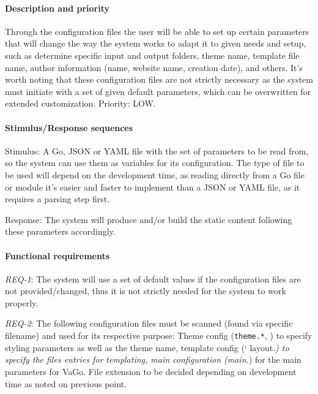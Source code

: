 \paragraph{Description and
priority}\label{par:description-and-priority-3}

Through the configuration files the user will be able to set up certain
parameters that will change the way the system works to adapt it to
given needs and setup, such as determine specific input and output
folders, theme name, template file name, author information (name,
website name, creation date), and others. It's worth noting that these
configuration files are not strictly necessary as the system must
initiate with a set of given default parameters, which can be
overwritten for extended customization. Priority: LOW.

\paragraph{Stimulus/Response
sequences}\label{par:stimulusresponse-sequences-3}

Stimulus: A Go\cite{donovan2015go}, JSON\cite{wikijson} or YAML\cite{wikiyaml} file with the set of parameters to be read
from, so the system can use them as variables for its configuration. The
type of file to be used will depend on the development time, as reading
directly from a Go file or module it's easier and faster to implement
than a JSON or YAML file, as it requires a parsing step first.

Response: The system will produce and/or build the static content
following these parameters accordingly.

\paragraph{Functional requirements}\label{par:functional-requirements-2}

\emph{REQ-1}: The system will use a set of default values if the
configuration files are not provided/changed, thus it is not strictly
needed for the system to work properly.

\emph{REQ-2}: The following configuration files must be scanned (found
via specific filename) and used for its respective purpose: Theme config
(\texttt{theme.*}, ) to specify styling parameters as well as the theme
name, template config (` layout.\emph{) to specify the files entries for
templating, main configuration (main.}) for the main parameters for
VaGo. File extension to be decided depending on development time as
noted on previous point.

